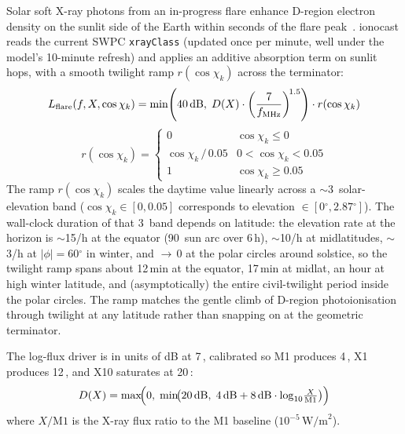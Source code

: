 \documentclass[11pt,a4paper]{article}
\newcommand{\SI}[2]{#1\,\text{#2}}
\newcommand{\dB}{\text{dB}}
\newcommand{\MHz}{\text{MHz}}
\newcommand{\degree}{\ensuremath{{}^\circ}}
\begin{document}
Solar soft X-ray photons from an in-progress flare enhance D-region
electron density on the sunlit side of the Earth within seconds of
the flare peak~\cite{mitra1974}.  ionocast reads the current SWPC
\texttt{xrayClass} (updated once per minute, well under the model's
10-minute refresh) and applies an additive absorption term on
sunlit hops, with a smooth twilight ramp $r(\cos\chi_k)$ across
the terminator:
\begin{equation}\label{eq:lflare}
  L_{\text{flare}}(f, X, \cos\chi_k) =
    \min\!\left(\SI{40}{\dB},\;
      D(X) \cdot \left(\dfrac{7}{f_{\text{MHz}}}\right)^{\!1.5}\right)
    \cdot r(\cos\chi_k)
\end{equation}
\begin{equation}\label{eq:lflare-ramp}
  r(\cos\chi_k) =
  \begin{cases}
    0                              & \cos\chi_k \leq 0 \\[3pt]
    \cos\chi_k \,/\, 0.05          & 0 < \cos\chi_k < 0.05 \\[3pt]
    1                              & \cos\chi_k \geq 0.05
  \end{cases}
\end{equation}
The ramp $r(\cos\chi_k)$ scales the daytime value linearly across a
$\sim$3\textdegree\ solar-elevation band ($\cos\chi_k \in [0,
0.05]$ corresponds to elevation $\in [0\degree, 2.87\degree]$).
The wall-clock duration of that 3\textdegree\ band depends on
latitude: the elevation rate at the horizon is
$\sim$15\textdegree/h at the equator (90\textdegree\ sun arc over
6\,h), $\sim$10\textdegree/h at midlatitudes,
$\sim$3\textdegree/h at $|\phi| = 60\degree$ in winter, and
${\to}\,0$ at the polar circles around solstice, so the
twilight ramp spans about 12\,min at the equator, 17\,min at
midlat, an hour at high winter latitude, and (asymptotically)
the entire civil-twilight period inside the polar circles.  The
ramp matches the gentle climb of D-region photoionisation through
twilight at any latitude rather than snapping on at the geometric
terminator.

The log-flux driver is in units of dB at \SI{7}{\MHz}, calibrated so
M1 produces \SI{4}{\dB}, X1 produces \SI{12}{\dB}, and X10 saturates
at \SI{20}{\dB}:
\begin{equation}\label{eq:lflare-driver}
  D(X) = \max\!\Bigl(0,\;
    \min\!\bigl(\SI{20}{\dB},\;
      \SI{4}{\dB} + \SI{8}{\dB}\cdot\log_{10}\!\tfrac{X}{\text{M1}}\bigr)\Bigr)
\end{equation}
where $X/\text{M1}$ is the X-ray flux ratio to the M1 baseline
($10^{-5}\,\text{W/m}^{2}$).
\end{document}

